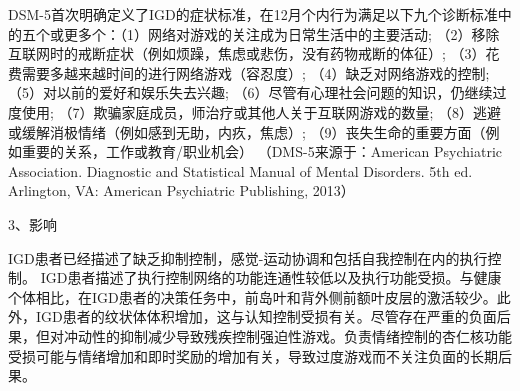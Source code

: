 DSM-5首次明确定义了IGD的症状标准，在12月个内行为满足以下九个诊断标准中的五个或更多个：（1）网络对游戏的关注成为日常生活中的主要活动; （2）移除互联网时的戒断症状（例如烦躁，焦虑或悲伤，没有药物戒断的体征）; （3）花费需要多越来越时间的进行网络游戏（容忍度）; （4）缺乏对网络游戏的控制; （5）对以前的爱好和娱乐失去兴趣; （6）尽管有心理社会问题的知识，仍继续过度使用; （7）欺骗家庭成员，师治疗或其他人关于互联网游戏的数量; （8）逃避或缓解消极情绪（例如感到无助，内疚，焦虑）; （9）丧失生命的重要方面（例如重要的关系，工作或教育/职业机会）
（DMS-5来源于：American Psychiatric Association. Diagnostic and Statistical Manual of Mental Disorders. 5th ed. Arlington, VA: American Psychiatric Publishing, 2013）

3、影响

IGD患者已经描述了缺乏抑制控制，感觉-运动协调和包括自我控制在内的执行控制。 IGD患者描述了执行控制网络的功能连通性较低以及执行功能受损。与健康个体相比，在IGD患者的决策任务中，前岛叶和背外侧前额叶皮层的激活较少。此外，IGD患者的纹状体体积增加，这与认知控制受损有关。尽管存在严重的负面后果，但对冲动性的抑制减少导致残疾控制强迫性游戏。负责情绪控制的杏仁核功能受损可能与情绪增加和即时奖励的增加有关，导致过度游戏而不关注负面的长期后果。








